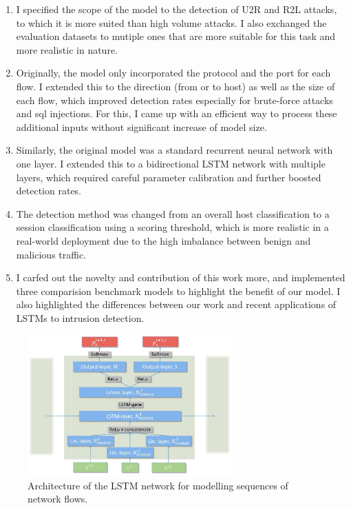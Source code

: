 \documentclass[a4paper,12pt,twoside]{article}
\begin{document}
\begin{enumerate}
\item I specified the scope of the model to the detection of U2R and R2L attacks, to which it is more suited than high volume attacks. I also exchanged the evaluation datasets to mutiple ones that are more suitable for this task and more realistic in nature.
\item Originally, the model only incorporated the protocol and the port for each flow. I extended this to the direction (from or to host) as well as the size of each flow, which improved detection rates especially for brute-force attacks and sql injections. For this, I came up with an efficient way to process these additional inputs without significant increase of model size.
\item Similarly, the original model was a standard recurrent neural network with one layer. I extended this to a bidirectional LSTM network with multiple layers, which required careful parameter calibration and further boosted detection rates.
\item The detection method was changed from an overall host classification to a session classification using a scoring threshold, which is more realistic in a real-world deployment due to the high imbalance between benign and malicious traffic.
\item I carfed out the novelty and contribution of this work more, and implemented three comparision benchmark models to highlight the benefit of our model. I also highlighted the differences between our work and recent applications of LSTMs to intrusion detection.
\end{enumerate}

\begin{figure}
\centering
\includegraphics[width=0.7\textwidth]{images/LSTM_design_new2.jpg}
\caption{Architecture of the LSTM network for modelling sequences of network flows.}
\label{fig:LSTM}
\end{figure}
\end{document}

